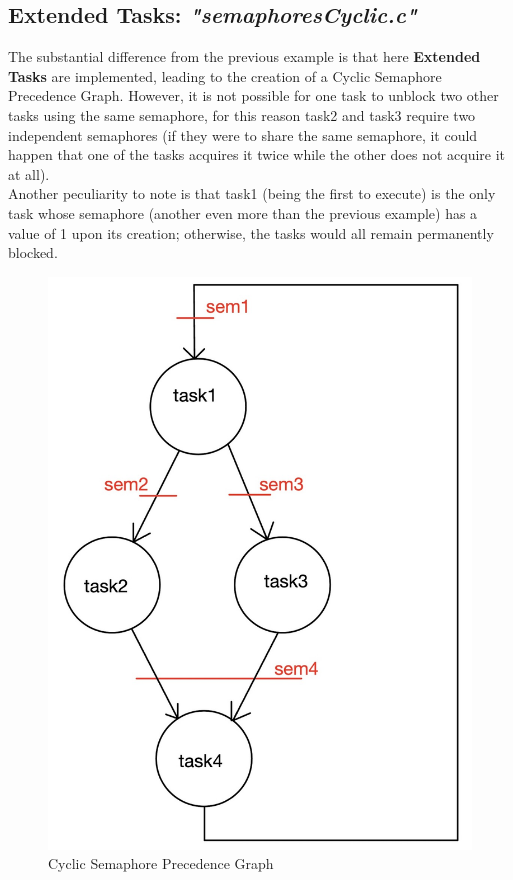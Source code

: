 \documentclass{article}
\begin{document}
\subsection{Extended Tasks: \textit{"semaphoresCyclic.c"}}
\begin{minipage}[t]{0.6\textwidth}
    The substantial difference from the previous example is that here \textbf{Extended Tasks} are implemented, leading to the creation of a Cyclic Semaphore Precedence Graph. However, it is not possible for one task to unblock two other tasks using the same semaphore, for this reason task2 and task3 require two independent semaphores (if they were to share the same semaphore, it could happen that one of the tasks acquires it twice while the other does not acquire it at all).\\[0.1cm]
    Another peculiarity to note is that task1 (being the first to execute) is the only task whose semaphore (another even more than the previous example) has a value of 1 upon its creation; otherwise, the tasks would all remain permanently blocked.\\[0.1cm]
    
\end{minipage}
\begin{minipage}[t]{0.4\textwidth}\vspace{-65pt}
    \begin{figure}[H]
        \centering
        \includegraphics[width=0.8\linewidth]{cyclic.jpeg}
        \caption{Cyclic Semaphore Precedence Graph}
    \end{figure}\noindent
\end{minipage}
\end{document}
